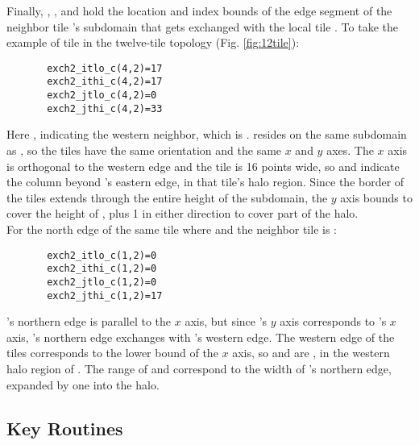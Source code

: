 Finally, ,
,
 and
 hold the location and index
bounds of the edge segment of the neighbor tile 's subdomain
that gets exchanged with the local tile .  To take the example
of tile  in the twelve-tile topology
(Fig. \ref{fig:12tile}): \\

\begin{verbatim}
       exch2_itlo_c(4,2)=17
       exch2_ithi_c(4,2)=17
       exch2_jtlo_c(4,2)=0
       exch2_jthi_c(4,2)=33
\end{verbatim}
 
Here , indicating the western neighbor, which is
.   resides on the same subdomain as , so
the tiles have the same orientation and the same $x$ and $y$ axes.
The $x$ axis is orthogonal to the western edge and the tile is 16
points wide, so  and 
indicate the column beyond 's eastern edge, in that tile's
halo region. Since the border of the tiles extends through the entire
height of the subdomain, the $y$ axis bounds  to
 cover the height of , plus 1 in
either direction to cover part of the halo. \\

For the north edge of the same tile  where  and 
the neighbor tile is :

\begin{verbatim}
       exch2_itlo_c(1,2)=0
       exch2_ithi_c(1,2)=0
       exch2_jtlo_c(1,2)=0
       exch2_jthi_c(1,2)=17
\end{verbatim}
 
's northern edge is parallel to the $x$ axis, but since
's $y$ axis corresponds to 's $x$ axis, 's
northern edge exchanges with 's western edge.  The western
edge of the tiles corresponds to the lower bound of the $x$ axis, so
 and  are , in the 
western halo region of . The range of
 and  correspond to the
width of 's northern edge, expanded by one into the halo. \\


\subsection{Key Routines}

